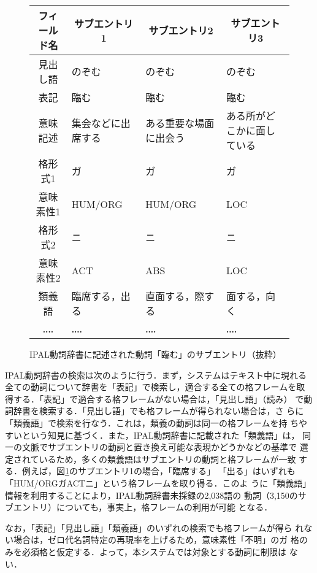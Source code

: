 \begin{figure}[htbp]
  \def\baselinestretch{}
  \begin{center}
    \small
    \begin{tabular}{|c||l|l|l|}
      \hline
      \multicolumn{1}{|c||}{フィールド名} & \multicolumn{1}{|c|}{サブエントリ1} & \multicolumn{1}{|c|}{サブエントリ2} & \multicolumn{1}{|c|}{サブエントリ3} \\
      \hline
      見出し語 & のぞむ & のぞむ & のぞむ\\
      表記 & 臨む & 臨む & 臨む\\
      意味記述 & 集会などに出席する & ある重要な場面に出会う & ある所がどこかに面している\\
      格形式1& ガ & ガ & ガ\\
      意味素性1& HUM/ORG & HUM/ORG & LOC\\ 
      格形式2 & ニ & ニ & ニ\\
      意味素性2 & ACT & ABS & LOC\\
      類義語 & 臨席する，出る & 直面する，際する & 面する，向く\\
      ‥‥ & ‥‥ & ‥‥ & ‥‥\\
      \hline
    \end{tabular}
    \caption{IPAL動詞辞書に記述された動詞「臨む」のサブエントリ（抜粋）}
    \label{fig:nozomu}
  \end{center}
\end{figure}

IPAL動詞辞書の検索は次のように行う．まず，システムはテキスト中に現れる
全ての動詞について辞書を「表記」で検索し，適合する全ての格フレームを取
得する．「表記」で適合する格フレームがない場合は，「見出し語」（読み）
で動詞辞書を検索する．「見出し語」でも格フレームが得られない場合は，さ
らに「類義語」で検索を行なう．これは，類義の動詞は同一の格フレームを持
ちやすいという知見に基づく．また，IPAL動詞辞書に記載された「類義語」は，
同一の文脈でサブエントリの動詞と置き換え可能な表現かどうかなどの基準で
選定されているため，多くの類義語はサブエントリの動詞と格フレームが一致
する．例えば，図\ref{fig:nozomu}のサブエントリ1の場合，「臨席する」
「出る」はいずれも「HUM/ORGガACTニ」という格フレームを取り得る．このよ
うに「類義語」情報を利用することにより，IPAL動詞辞書未採録の2,038語の
動詞（3,150のサブエントリ）についても，事実上，格フレームの利用が可能
となる．

なお，「表記」「見出し語」「類義語」のいずれの検索でも格フレームが得ら
れない場合は，ゼロ代名詞特定の再現率を上げるため，意味素性「不明」のガ
格のみを必須格と仮定する．よって，本システムでは対象とする動詞に制限は
ない．

